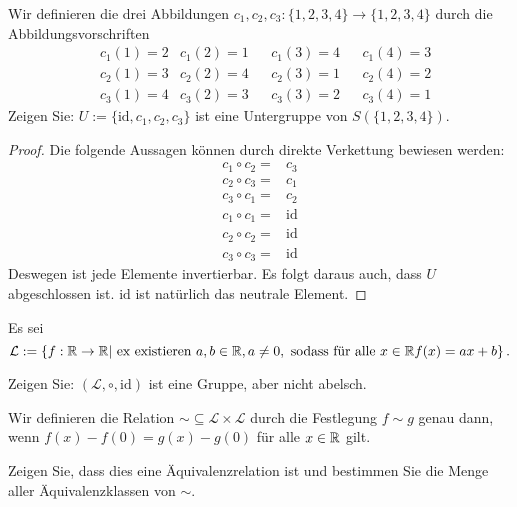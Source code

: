 \begin{Problem}
	Wir definieren die drei Abbildungen $c_1, c_2, c_3 : \{1, 2, 3, 4\} \to \{1, 2, 3, 4\}$ durch die Abbildungsvorschriften
	\begin{align*}
	& 	c_1(1)=2 & c_1(2) = 1 & & c_1(3) = 4 & & c_1(4)=3\\
	& c_2(1)=3 & c_2(2)=4 & & c_2(3) = 1 & & c_2(4)=2 \\
	& c_3(1) = 4 & c_3(2) = 3 & & c_3(3) = 2 & & c_3(4) = 1
	\end{align*}
	Zeigen Sie: $U := \{\text{id}, c_1, c_2, c_3\}$ ist eine Untergruppe von $S(\{1, 2, 3, 4\})$.
\end{Problem}
\begin{proof}
	Die folgende Aussagen können durch direkte Verkettung bewiesen werden:
	\begin{align*}
		c_1\circ c_2=&c_3\\
		c_2\circ c_3=&c_1\\
		c_3\circ c_1=&c_2\\
		c_1\circ c_1=&\text{id}\\
		c_2\circ c_2=&\text{id}\\
		c_3\circ c_3=&\text{id}
	\end{align*}
	Deswegen ist jede Elemente invertierbar. Es folgt daraus auch, dass $U$ abgeschlossen ist. $\text{id}$ ist natürlich das neutrale Element.
\end{proof}
\begin{Problem}
	Es sei
	\[
		\mathcal{L}:=\left\{ f:\mathbb{R}\to\mathbb{R}|\text{ ex existieren }a,b\in \mathbb{R}, a\neq 0, \text{ sodass f\"{u}r alle }x\in \mathbb{R} f(x)=ax+b \right\} 
	.\] 
	\begin{parts}
	\item Zeigen Sie: $\left( \mathcal{L},\circ, \text{id} \right) $ ist eine Gruppe, aber nicht abelsch.
	\item Wir definieren die Relation $\sim\subseteq \mathcal{L}\times \mathcal{L}$ durch die Festlegung $f\sim g$ genau dann, wenn $f(x)-f(0)=g(x)-g(0)$ f\"{u}r alle $x\in \mathbb{R}$ gilt.

		Zeigen Sie, dass dies eine Äquivalenzrelation ist und bestimmen Sie die Menge aller Äquivalenzklassen von $\sim$.
	\end{parts}
\end{Problem}
